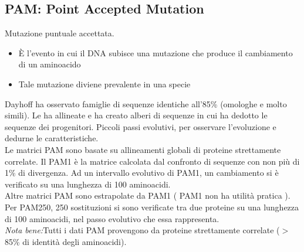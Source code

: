 \documentclass{article}
\begin{document}
\subsection{PAM: Point Accepted Mutation}
Mutazione puntuale accettata.
\begin{itemize}
    \item È l'evento in cui il DNA subisce una mutazione che produce il
    cambiamento di un aminoacido
    \item Tale mutazione diviene prevalente in una specie
\end{itemize}
Dayhoff ha osservato famiglie di sequenze identiche all'85\%
(omologhe e molto simili). Le ha allineate e ha creato alberi di
sequenze in cui ha dedotto le sequenze dei progenitori.
Piccoli passi evolutivi, per osservare l'evoluzione e dedurne le
caratteristiche.\\
Le matrici PAM sono basate su allineamenti globali di
proteine strettamente correlate. Il PAM1 è la matrice calcolata dal confronto di sequenze con
non più di 1\% di divergenza. Ad un intervallo evolutivo di
PAM1, un cambiamento si è verificato su una lunghezza di
100 aminoacidi.\\
Altre matrici PAM sono estrapolate da PAM1 ( PAM1 non ha
utilità pratica ). Per PAM250, 250 sostituzioni si sono verificate
tra due proteine su una lunghezza di 100 aminoacidi, nel
passo evolutivo che essa rappresenta.\\
\textit{Nota bene:}Tutti i dati PAM provengono da proteine
strettamente correlate ($>$ 85\% di identità degli aminoacidi).
\newpage
\end{document}
